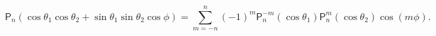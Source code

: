 \[\mathsf{P}_{n}\left(\cos\theta_{1}\cos\theta_{2}+\sin\theta_{1}\sin\theta_{2}%
\cos\phi\right)=\sum_{m=-n}^{n}(-1)^{m}\mathsf{P}^{-m}_{n}\left(\cos\theta_{1}%
\right)\mathsf{P}^{m}_{n}\left(\cos\theta_{2}\right)\cos\left(m\phi\right).\]